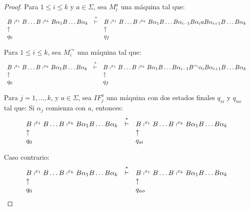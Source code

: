 \begin{proof}
    \PN Para $1 \leq i \leq k$ y $a \in \Sigma $, sea $M_{i}^{a}$ una máquina tal que:
    \[
      \begin{array}{lcl}
        B \shortmid^{x_{1}} B \dotsc B \shortmid^{x_{k}} B \alpha_{1} B \dotsc B \alpha_{k} &\overset{\ast}{\vdash}& B
          \shortmid^{x_{1}} B \dotsc B \shortmid^{x_{k}} B \alpha_{1} B \dotsc B \alpha_{i-1} B \alpha_{i} a B
          \alpha_{i+1} B \dotsc B \alpha_{k} \\
        \uparrow && \uparrow \\
        q_{0} && q_{f}
      \end{array}
    \]

    \PN Para $1 \leq i \leq k$, sea $M_{i}^{\curvearrowright}$ una máquina tal que:
    \[
      \begin{array}{lcl}
        B \shortmid^{x_{1}} B \dotsc B \shortmid^{x_{k}} B \alpha_{1} B \dotsc B \alpha_{k} &\overset{\ast}{\vdash}& B
          \shortmid^{x_{1}} B \dotsc B \shortmid^{x_{k}} B \alpha_{1} B \dotsc B \alpha_{i-1} B^{\curvearrowright}
          \alpha_{i} B \alpha_{i+1} B \dotsc B \alpha_{k} \\
        \uparrow && \uparrow \\
        q_{0} && q_{f}
      \end{array}
    \]

    \PN Para $j=1, \dotsc, k$, y $a \in \Sigma$, sea $IF_{j}^{a}$ una máquina con dos estados finales $q_{si}$ y
    $q_{no}$ tal que:
    \PN Si $\alpha_{j}$ comienza con $a$, entonces:
    \[
      \begin{array}{lcl}
        B \shortmid^{x_{1}} B \dotsc B \shortmid^{x_{k}} B \alpha_{1} B \dotsc B \alpha_{k} &\overset{\ast}{\vdash}& B
          \shortmid^{x_{1}} B \dotsc B \shortmid^{x_{k}} B \alpha_{1} B \dotsc B \alpha_{k} \\
        \uparrow && \uparrow \\
        q_{0} && q_{si}
      \end{array}
    \]

    \PN Caso contrario:
    \[
      \begin{array}{lcl}
        B \shortmid^{x_{1}} B \dotsc B \shortmid^{x_{k}} B \alpha_{1} B \dotsc B \alpha_{k} &\overset{\ast}{\vdash}& B
          \shortmid^{x_{1}} B \dotsc B \shortmid^{x_{k}} B \alpha_{1} B \dotsc B \alpha_{k} \\
        \uparrow && \uparrow \\
        q_{0} && q_{no}
      \end{array}
    \]


\end{proof}
